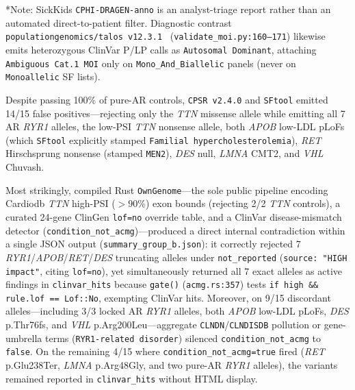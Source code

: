 \documentclass[11pt,letterpaper]{article}
\begin{document}
\begin{table}[!t]
\raggedright\footnotesize{*Note: SickKids \texttt{CPHI-DRAGEN-anno} is an analyst-triage report rather than an automated direct-to-patient filter. Diagnostic contrast \texttt{populationgenomics/talos v12.3.1}~\citep{welland2026talos} (\texttt{validate\_moi.py:160--171}) likewise emits heterozygous ClinVar P/LP calls as \texttt{Autosomal Dominant}, attaching \texttt{Ambiguous Cat.1 MOI} only on \texttt{Mono\_And\_Biallelic} panels (never on \texttt{Monoallelic} SF lists).}
\end{table}

Despite passing 100\% of pure-AR controls, \texttt{CPSR v2.4.0} and \texttt{SFtool} emitted 14/15 false positives---rejecting only the \textit{TTN} missense allele while emitting all 7 AR \textit{RYR1} alleles, the low-PSI \textit{TTN} nonsense allele, both \textit{APOB} low-LDL pLoFs (which \texttt{SFtool} explicitly stamped \texttt{Familial hypercholesterolemia}), \textit{RET} Hirschsprung nonsense (stamped \texttt{MEN2}), \textit{DES} null, \textit{LMNA} CMT2, and \textit{VHL} Chuvash.

Most strikingly, compiled Rust \texttt{OwnGenome}---the sole public pipeline encoding Cardiodb \textit{TTN} high-PSI ($>90\%$) exon bounds (rejecting 2/2 \textit{TTN} controls), a curated 24-gene ClinGen \texttt{lof=no} override table, and a ClinVar disease-mismatch detector (\texttt{condition\_\allowbreak not\_\allowbreak acmg})---produced a direct internal contradiction within a single JSON output (\texttt{summary\_\allowbreak group\_\allowbreak b.json}): it correctly rejected 7 \textit{RYR1}/\textit{APOB}/\textit{RET}/\textit{DES} truncating alleles under \texttt{not\_\allowbreak reported} (\texttt{source: "HIGH impact"}, citing \texttt{lof=no}), yet simultaneously returned all 7 exact alleles as active findings in \texttt{clinvar\_\allowbreak hits} because \texttt{gate()} (\texttt{acmg.rs:357}) tests \texttt{if high \&\& rule.lof == Lof::No}, exempting ClinVar hits. Moreover, on 9/15 discordant alleles---including 3/3 locked AR \textit{RYR1} alleles, both \textit{APOB} low-LDL pLoFs, \textit{DES} p.Thr76fs, and \textit{VHL} p.Arg200Leu---aggregate \texttt{CLNDN}/\texttt{CLNDISDB} pollution or gene-umbrella terms (\texttt{RYR1-related disorder}) silenced \texttt{condition\_\allowbreak not\_\allowbreak acmg} to \texttt{false}. On the remaining 4/15 where \texttt{condition\_\allowbreak not\_\allowbreak acmg=true} fired (\textit{RET} p.Glu238Ter, \textit{LMNA} p.Arg48Gly, and two pure-AR \textit{RYR1} alleles), the variants remained reported in \texttt{clinvar\_\allowbreak hits} without HTML display.
\end{document}
